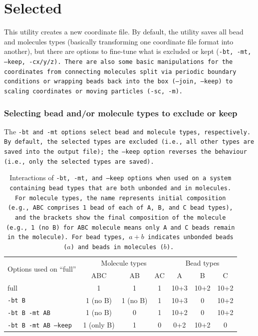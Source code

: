 \section{Selected} \label{sec:Selected}

This utility creates a new coordinate file. By default, the utility saves all
bead and molecules types (basically transforming one coordinate file format into
another), but there are options to fine-tune what is excluded or kept (\tt{-bt},
\tt{-mt}, \tt{--keep}, \tt{-cx/y/z}). There are also some basic manipulations
for the coordinates from connecting molecules split via periodic boundary
conditions or wrapping beads back into the box (\tt{--join}, \tt{--keep}) to
scaling coordinates or moving particles (\tt{-sc}, \tt{-m}).

\subsubsection*{Selecting bead and/or molecule types to exclude or keep}

The \tt{-bt} and \tt{-mt} options select bead and molecule types, respectively.
By default, the selected types are excluded (i.e., all other types are saved
into the output file); the \tt{--keep} option reverses the behaviour (i.e., only
the selected types are saved).

\begin{table}[h]
  \caption{
    Interactions of \tt{-bt}, \tt{-mt}, and \tt{--keep} options when used on a
    system containing bead types that are both unbonded and in molecules. For
    molecule types, the name represents initial composition (e.g., \tt{ABC}
    comprises 1 bead of each of \tt{A}, \tt{B}, and \tt{C} bead types), and the
    brackets show the final composition of the molecule (e.g., 1~(no \tt{B}) for
    \tt{ABC} molecule means only \tt{A} and \tt{C} beads remain in the
    molecule). For bead types, $a+b$ indicates unbonded beads ($a$) and beads in
    molecules ($b$).
  }\label{tab:Selected-btmtkeep}
  \centering
  \begin{tabular}{lcccccc}
    \toprule
    \multirow{2}{*}{Options used on \enquote{full}}
    & \multicolumn{3}{c}{Molecule types} & \multicolumn{3}{c}{Bead types} \\
    \cmidrule(lr){2-4} \cmidrule(lr){5-7}
                             & ABC        & AB       & AC & A    & B    & C\\
    \midrule
    full                     & 1          & 1        & 1 & 10+3 & 10+2 & 10+2\\
    \cmidrule(lr){1-7}
    \tt{-bt B}               & 1 (no B)   & 1 (no B) & 1 & 10+3 & 0    & 10+2\\
    \tt{-bt B -mt AB}        & 1 (no B)   & 0        & 1 & 10+2 & 0    & 10+2\\
    \tt{-bt B -mt AB --keep} & 1 (only B) & 1        & 0 & 0+2  & 10+2 & 0\\
    \bottomrule
  \end{tabular}
\end{table}

